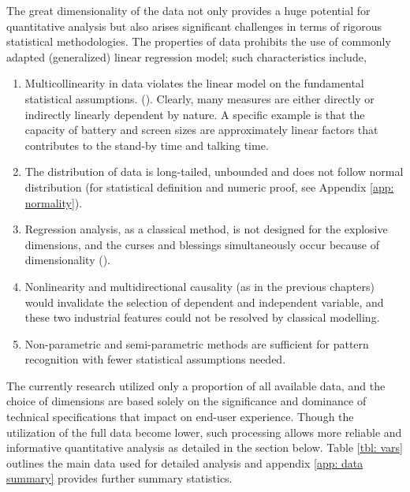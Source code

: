 \documentclass[utf8,english]{gradu3}
\begin{document}
The great dimensionality of the data not only provides a huge potential for quantitative analysis but also arises significant challenges in terms of rigorous statistical methodologies. The properties of data prohibits the use of commonly adapted (generalized) linear regression model; such characteristics include,

\begin{enumerate}
    \item Multicollinearity in data violates the linear model on the fundamental statistical assumptions. (\cite{farrar1967multicollinearity}). Clearly, many measures are either directly or indirectly linearly dependent by nature. A specific example is that the capacity of battery and screen sizes are approximately linear factors that contributes to the stand-by time and talking time. 
    \item The distribution of data is long-tailed, unbounded and does not follow normal distribution (for statistical definition and numeric proof, see Appendix \ref{app: normality}).
    \item Regression analysis, as a classical method, is not designed for the explosive dimensions, and the curses and blessings simultaneously occur because of dimensionality (\cite{donoho2000high}).
    \item Nonlinearity and multidirectional causality (as in the previous chapters) would invalidate the selection of dependent and independent variable, and these two industrial features could not be resolved by classical modelling.
    \item Non-parametric and semi-parametric methods are sufficient for pattern recognition with fewer statistical assumptions needed.
\end{enumerate}

The currently research utilized only a proportion of all available data, and the choice of dimensions are based solely on the significance and dominance of technical specifications that impact on end-user experience. Though the utilization of the full data become lower, such processing allows more reliable and informative quantitative analysis as detailed in the section below. Table \ref{tbl: vars} outlines the main data used for detailed analysis and appendix \ref{app: data summary} provides further summary statistics.
\end{document}
